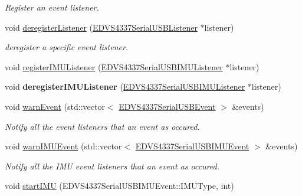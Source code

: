 \begin{DoxyCompactItemize}
\begin{DoxyCompactList}\small\item\em Register an event listener. \end{DoxyCompactList}\item 
void \hyperlink{class_e_d_v_s4337_serial_u_s_b_a327a91b0d54282de0ae8fdcc47e15b0a}{deregister\+Listener} (\hyperlink{class_e_d_v_s4337_serial_u_s_b_listener}{E\+D\+V\+S4337\+Serial\+U\+S\+B\+Listener} $\ast$listener)
\begin{DoxyCompactList}\small\item\em deregister a specific event listener. \end{DoxyCompactList}\item 
void \hyperlink{class_e_d_v_s4337_serial_u_s_b_a78e3c01f241b7e40debd7be4556d69c3}{register\+I\+M\+U\+Listener} (\hyperlink{class_e_d_v_s4337_serial_u_s_b_i_m_u_listener}{E\+D\+V\+S4337\+Serial\+U\+S\+B\+I\+M\+U\+Listener} $\ast$listener)
\item 
\hypertarget{class_e_d_v_s4337_serial_u_s_b_a4f46c52151f14a417c3051554e6d55c9}{}void {\bfseries deregister\+I\+M\+U\+Listener} (\hyperlink{class_e_d_v_s4337_serial_u_s_b_i_m_u_listener}{E\+D\+V\+S4337\+Serial\+U\+S\+B\+I\+M\+U\+Listener} $\ast$listener)\label{class_e_d_v_s4337_serial_u_s_b_a4f46c52151f14a417c3051554e6d55c9}

\item 
\hypertarget{class_e_d_v_s4337_serial_u_s_b_abddef8a14c7460309a50ab8087c96c35}{}void \hyperlink{class_e_d_v_s4337_serial_u_s_b_abddef8a14c7460309a50ab8087c96c35}{warn\+Event} (std\+::vector$<$ \hyperlink{struct_e_d_v_s4337_serial_u_s_b_event}{E\+D\+V\+S4337\+Serial\+U\+S\+B\+Event} $>$ \&events)\label{class_e_d_v_s4337_serial_u_s_b_abddef8a14c7460309a50ab8087c96c35}

\begin{DoxyCompactList}\small\item\em Notify all the event listeners that an event as occured. \end{DoxyCompactList}\item 
\hypertarget{class_e_d_v_s4337_serial_u_s_b_a8428d013f20a418abd24f48b89f0b128}{}void \hyperlink{class_e_d_v_s4337_serial_u_s_b_a8428d013f20a418abd24f48b89f0b128}{warn\+I\+M\+U\+Event} (std\+::vector$<$ \hyperlink{struct_e_d_v_s4337_serial_u_s_b_i_m_u_event}{E\+D\+V\+S4337\+Serial\+U\+S\+B\+I\+M\+U\+Event} $>$ \&events)\label{class_e_d_v_s4337_serial_u_s_b_a8428d013f20a418abd24f48b89f0b128}

\begin{DoxyCompactList}\small\item\em Notify all the I\+M\+U event listeners that an event as occured. \end{DoxyCompactList}\item 
\hypertarget{class_e_d_v_s4337_serial_u_s_b_aac0296a78f69948dbf43611425998e23}{}void \hyperlink{class_e_d_v_s4337_serial_u_s_b_aac0296a78f69948dbf43611425998e23}{start\+I\+M\+U} (E\+D\+V\+S4337\+Serial\+U\+S\+B\+I\+M\+U\+Event\+::\+I\+M\+U\+Type, int)\label{class_e_d_v_s4337_serial_u_s_b_aac0296a78f69948dbf43611425998e23}


\end{DoxyCompactItemize}
